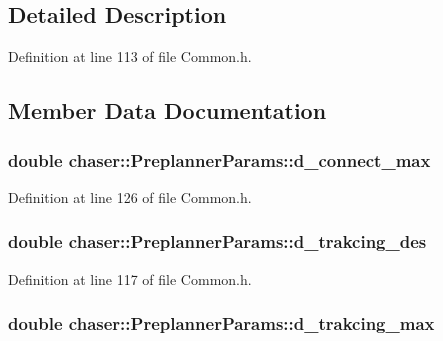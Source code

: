 \subsection{Detailed Description}


Definition at line 113 of file Common.\+h.



\subsection{Member Data Documentation}
\subsubsection[{\texorpdfstring{d\+\_\+connect\+\_\+max}{d_connect_max}}]{\setlength{\rightskip}{0pt plus 5cm}double chaser\+::\+Preplanner\+Params\+::d\+\_\+connect\+\_\+max}\hypertarget{structchaser_1_1_preplanner_params_a90021bd30b7e88b50cf9317ff3673482}{}\label{structchaser_1_1_preplanner_params_a90021bd30b7e88b50cf9317ff3673482}


Definition at line 126 of file Common.\+h.

\subsubsection[{\texorpdfstring{d\+\_\+trakcing\+\_\+des}{d_trakcing_des}}]{\setlength{\rightskip}{0pt plus 5cm}double chaser\+::\+Preplanner\+Params\+::d\+\_\+trakcing\+\_\+des}\hypertarget{structchaser_1_1_preplanner_params_a6a950244cbb256abb9a4e93388c0177f}{}\label{structchaser_1_1_preplanner_params_a6a950244cbb256abb9a4e93388c0177f}


Definition at line 117 of file Common.\+h.

\subsubsection[{\texorpdfstring{d\+\_\+trakcing\+\_\+max}{d_trakcing_max}}]{\setlength{\rightskip}{0pt plus 5cm}double chaser\+::\+Preplanner\+Params\+::d\+\_\+trakcing\+\_\+max}\hypertarget{structchaser_1_1_preplanner_params_ad6659842d3039da7b064532a090651d3}{}\label{structchaser_1_1_preplanner_params_ad6659842d3039da7b064532a090651d3}


